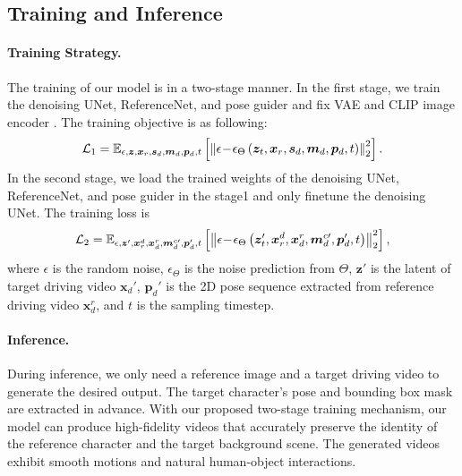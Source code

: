 \subsection{Training and Inference}

\paragraph{Training Strategy.}
The training of our model is in a two-stage manner.
In the first stage, we train the denoising UNet, ReferenceNet, and pose guider and fix VAE \cite{kingma2013auto} and CLIP image encoder \cite{radford2021learning}.
The training objective is as following:
\begin{equation}
\scriptsize
\mathcal{L}_{\text{1}}=\mathbb{E}_{\epsilon, \boldsymbol{z}, \boldsymbol{x}_r, \boldsymbol{s}_d, \boldsymbol{m}_d, \boldsymbol{p}_d, t}\left[\left\|\epsilon\!-\!\epsilon_{\Theta}\left(\boldsymbol{z}_t, \boldsymbol{x}_r, \boldsymbol{s}_d, \boldsymbol{m}_d, \boldsymbol{p}_d, t\right)\right\|_2^2\right].
\label{equ:first_stage}
\end{equation}
In the second stage, we load the trained weights of the denoising UNet, ReferenceNet, and pose guider in the stage1 and only finetune the denoising UNet. 
The training loss is
\begin{equation}
\scriptsize
\mathcal{L}_{\text{2}}=\mathbb{E}_{\epsilon, \boldsymbol{z}', \boldsymbol{x}_r^d, \boldsymbol{x}_d^r, \boldsymbol{m}_d^{c\prime}, \boldsymbol{p}_d', t}\left[\left\|\epsilon\!-\!\epsilon_{\Theta}\left(\boldsymbol{z}_{t}', \boldsymbol{x}_r^d, \boldsymbol{x}_d^r, \boldsymbol{m}_d^{c\prime}, \boldsymbol{p}_d', t\right)\right\|_2^2\right],
\label{equ:second_stage}
\end{equation}
where $\epsilon$ is the random noise, $\epsilon_\Theta$ is the noise prediction from $\Theta$, $\boldsymbol{z}'$ is the latent of target driving video $\boldsymbol{x}_d'$, $\boldsymbol{p}_d'$ is the 2D pose sequence extracted from reference driving video $\boldsymbol{x}_d^r$, and $t$ is the sampling timestep.

\paragraph{Inference.}
During inference, we only need a reference image and a target driving video to generate the desired output. 
The target character's pose and bounding box mask are extracted in advance.
With our proposed two-stage training mechanism, our model can produce high-fidelity videos that accurately preserve the identity of the reference character and the target background scene. 
The generated videos exhibit smooth motions and natural human-object interactions.


